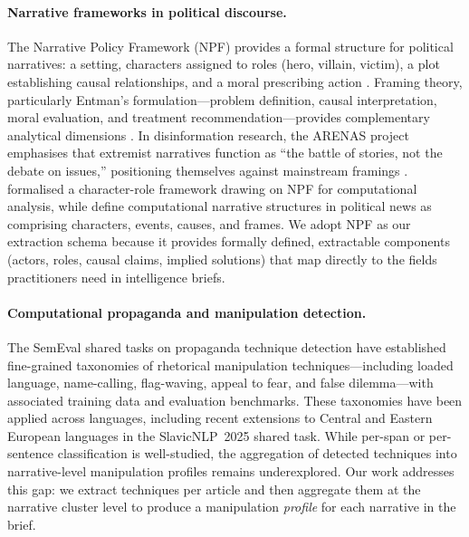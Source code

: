 \documentclass[10pt, a4paper]{article}
\begin{document}
\paragraph{Narrative frameworks in political discourse.}
The Narrative Policy Framework (NPF) provides a formal structure for political narratives: a setting, characters assigned to roles (hero, villain, victim), a plot establishing causal relationships, and a moral prescribing action \citep{jones2010narrative, shanahan2018narrative}. Framing theory, particularly Entman's formulation---problem definition, causal interpretation, moral evaluation, and treatment recommendation---provides complementary analytical dimensions \citep{entman1993framing}. In disinformation research, the ARENAS project emphasises that extremist narratives function as ``the battle of stories, not the debate on issues,'' positioning themselves against mainstream framings \citep{arenas2022}. \citet{gehring2023character} formalised a character-role framework drawing on NPF for computational analysis, while \citet{mandravickaite2025narrative} define computational narrative structures in political news as comprising characters, events, causes, and frames. We adopt NPF as our extraction schema because it provides formally defined, extractable components (actors, roles, causal claims, implied solutions) that map directly to the fields practitioners need in intelligence briefs.

\paragraph{Computational propaganda and manipulation detection.}
The SemEval shared tasks on propaganda technique detection \citep{dasamartino2019fine, piskorski2023semeval, piskorski2024semeval} have established fine-grained taxonomies of rhetorical manipulation techniques---including loaded language, name-calling, flag-waving, appeal to fear, and false dilemma---with associated training data and evaluation benchmarks. These taxonomies have been applied across languages, including recent extensions to Central and Eastern European languages in the SlavicNLP~2025 shared task. While per-span or per-sentence classification is well-studied, the aggregation of detected techniques into narrative-level manipulation profiles remains underexplored. Our work addresses this gap: we extract techniques per article and then aggregate them at the narrative cluster level to produce a manipulation \emph{profile} for each narrative in the brief.
\end{document}
